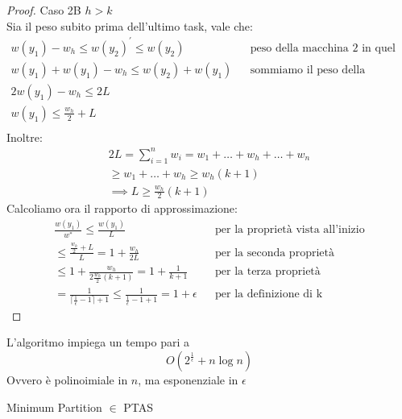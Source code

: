 \begin{proof}
    Caso 2B $h > k$\\
    Sia il peso subito prima dell'ultimo task, vale che: 
    \begin{equation}
        \begin{aligned}
            w(y_1) - w_h \leq w(y_2)^\prime \leq w(y_2) && \text{peso della macchina 2 in quel momento}\\
            w(y_1) + w(y_1)- w_h \leq w(y_2) + w(y_1)&& \text{sommiamo il peso della macchina 1}\\
            2w(y_1) - w_h \leq 2L\\
            w(y_1) \leq \frac{w_h}{2} + L\\
        \end{aligned}
    \end{equation}
    Inoltre:
    \begin{equation}
        \begin{aligned}
            2L = \sum_{i = 1}^{n} w_i = w_1 + \dots + w_h + \dots + w_n\\
            \geq w_1 + \dots + w_h \geq w_h(k+1)\\
            \implies L \geq \frac{w_h}{2}(k+1)
        \end{aligned}
    \end{equation}
    Calcoliamo ora il rapporto di approssimazione:
    \begin{equation}
        \begin{aligned}
            \frac{w(y_1)}{w^*} \leq \frac{w(y_1)}{L}&& \text{per la proprietà vista all'inizio}\\
            \leq \frac{\frac{w_h}{2} + L}{L} = 1 + \frac{w_h}{2L}&& \text{per la seconda proprietà}\\
            \leq 1 + \frac{w_h}{2\frac{w_h}{2}(k+1)} = 1 + \frac{1}{k+1}&& \text{per la terza proprietà}\\
            = \frac{1}{\lceil \frac{1}{\epsilon} -1 \rceil +1} \leq 
            \frac{1}{\frac{1}{\epsilon} -1 +1} = 1+\epsilon&& \text{per la definizione di k}
        \end{aligned}
    \end{equation}
\end{proof}
\begin{theorem}
    L'algoritmo impiega un tempo pari a 
    $$O(2^{\frac{1}{\epsilon}} + n\log n)$$
    Ovvero è polinoimiale in $n$, ma esponenziale in $\epsilon$
\end{theorem}
\begin{corollary}
    Minimum Partition $\in$ PTAS
\end{corollary}
